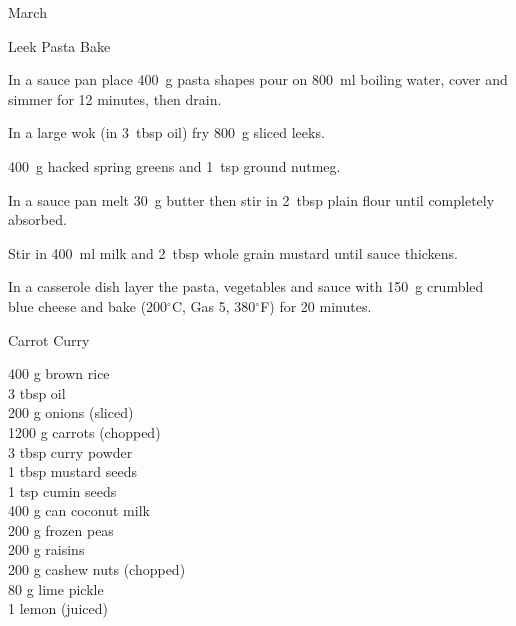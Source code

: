 \begin{menu}{March}
\begin{recipe}{2}{Leek Pasta Bake}
    \begin{instructions}
    \item 
    In a
    sauce pan
    place
    400~g  pasta shapes
    pour on
    800~ml  boiling water,
    cover and simmer for 12 minutes, then drain.
  \item 
        In a large wok
        (in 3~tbsp  oil)
        fry
        800~g sliced leeks.
      \item 400~g hacked spring greens
        and
        1~tsp  ground nutmeg.
      \item 
        In a sauce pan melt
        30~g  butter
        then stir in
        2~tbsp  plain flour
        until completely absorbed.
      \item 
        Stir in
        400~ml  milk
        and
        2~tbsp  whole grain mustard
        until sauce thickens.
      \item 
        In a casserole dish
        layer the pasta, vegetables and sauce with
        150~g crumbled blue cheese
        and bake
        (200$^{\circ}$C, Gas 5, 380$^{\circ}$F)
        for 20 minutes.
      
    \end{instructions}
    \end{recipe}%
  
    \begin{recipe}{2}{Carrot Curry}%
		\begin{ingredients}
		400 g brown rice  \\
	3 tbsp oil  \\
	200 g onions (sliced) \\
	1200 g carrots (chopped) \\
	3 tbsp curry powder  \\
	1 tbsp mustard seeds  \\
	1 tsp cumin seeds  \\
	400 g can coconut milk  \\
	200 g frozen peas  \\
	200 g raisins  \\
	200 g cashew nuts (chopped) \\
	80 g lime pickle  \\
	1  lemon (juiced) \\
	
		\end{ingredients}
	
	
	

\end{recipe}
\end{menu}
